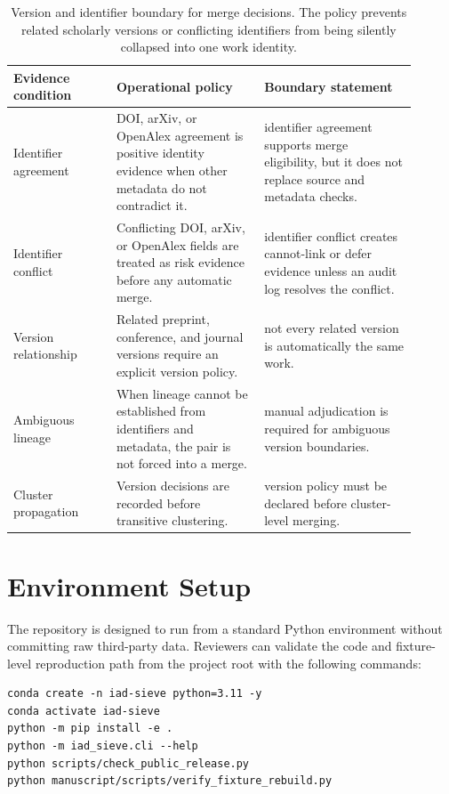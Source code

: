 \documentclass[11pt]{article}
\begin{document}
\begin{table}[H]
\caption{Version and identifier boundary for merge decisions. The policy prevents related scholarly versions or conflicting identifiers from being silently collapsed into one work identity.}
\label{tab:version-identifier-boundary}
\centering
\footnotesize
\setlength{\tabcolsep}{3pt}
\begin{tabular}{L{0.23\linewidth}L{0.33\linewidth}L{0.34\linewidth}}
\toprule
Evidence condition & Operational policy & Boundary statement \\
\midrule
Identifier agreement & DOI, arXiv, or OpenAlex agreement is positive identity evidence when other metadata do not contradict it. & identifier agreement supports merge eligibility, but it does not replace source and metadata checks. \\
Identifier conflict & Conflicting DOI, arXiv, or OpenAlex fields are treated as risk evidence before any automatic merge. & identifier conflict creates cannot-link or defer evidence unless an audit log resolves the conflict. \\
Version relationship & Related preprint, conference, and journal versions require an explicit version policy. & not every related version is automatically the same work. \\
Ambiguous lineage & When lineage cannot be established from identifiers and metadata, the pair is not forced into a merge. & manual adjudication is required for ambiguous version boundaries. \\
Cluster propagation & Version decisions are recorded before transitive clustering. & version policy must be declared before cluster-level merging. \\
\bottomrule
\end{tabular}
\end{table}

\section{Environment Setup}

The repository is designed to run from a standard Python environment without committing raw third-party data. Reviewers can validate the code and fixture-level reproduction path from the project root with the following commands:

\small
\begin{verbatim}
conda create -n iad-sieve python=3.11 -y
conda activate iad-sieve
python -m pip install -e .
python -m iad_sieve.cli --help
python scripts/check_public_release.py
python manuscript/scripts/verify_fixture_rebuild.py
\end{verbatim}
\normalsize
\end{document}
